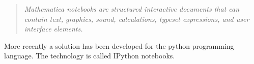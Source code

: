 \documentclass[10pt, a4paper]{article}  %
\begin{document}
\begin{multicols}{2}
\begin{quote}
\textit{ Mathematica notebooks are structured interactive documents that can
contain text, graphics, sound, calculations, typeset expressions, and user
interface elements.}
\end{quote}

More recently a solution has been developed for the python programming
language. The technology is called IPython notebooks.


\end{multicols}
\end{document}
